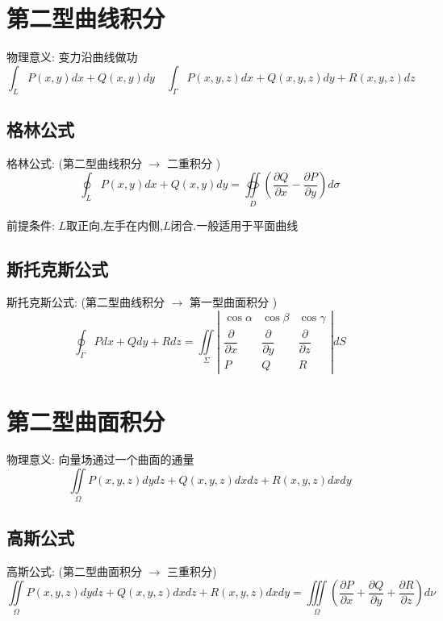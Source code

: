 \section{第二型曲线积分}

\begin{definition}[第二型曲线积分]
	物理意义: 变力沿曲线做功
	$$\int_{L}P(x,y)dx+Q(x,y)dy \quad \int_{\Gamma}P(x,y,z)dx+Q(x,y,z)dy+R(x,y,z)dz$$
\end{definition}
\subsection{格林公式}
\begin{theorem}
	格林公式: (第二型曲线积分 $\to$ 二重积分 )
	$$\oint_{L}P(x,y)dx+Q(x,y)dy=\oiint\limits_{D}(\frac{\partial Q}{\partial x}-\frac{\partial P}{\partial y})d\sigma$$
	
	前提条件: $L$取正向,左手在内侧,$L$闭合.一般适用于平面曲线
\end{theorem}
\subsection{斯托克斯公式}
\begin{theorem}[斯托克斯公式]
	斯托克斯公式: (第二型曲线积分 $\to$ 第一型曲面积分 )
	$$\oint_{\Gamma}Pdx+Qdy+Rdz=\iint\limits_{\Sigma}\left| \begin{array}{lll}
		\cos\alpha&\cos\beta&\cos\gamma\\
		\dfrac{\partial}{\partial x}&\dfrac{\partial }{\partial y}&\dfrac{\partial}{\partial z}\\
		P&Q&R
	\end{array}\right|dS $$
\end{theorem}

\section{第二型曲面积分}
\begin{definition}[第二型曲面积分]
	物理意义: 向量场通过一个曲面的通量
	$$\iint\limits_{\Omega}P(x,y,z)dydz+Q(x,y,z)dxdz+R(x,y,z)dxdy$$
\end{definition}
\subsection{高斯公式}
\begin{theorem}[高斯公式]
	高斯公式: (第二型曲面积分 $\to$ 三重积分)
	$$\iint\limits_{\Omega}P(x,y,z)dydz+Q(x,y,z)dxdz+R(x,y,z)dxdy=\iiint\limits_{\Omega}(\frac{\partial P}{\partial x}+\frac{\partial Q}{\partial y}+\frac{\partial R}{\partial z})d\nu$$
\end{theorem}